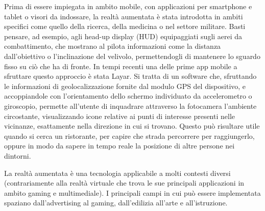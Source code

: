Prima di essere impiegata in ambito mobile, con applicazioni per smartphone e tablet o visori da indossare, la realtà aumentata è stata introdotta in ambiti specifici come quello della ricerca, della medicina o nel settore militare. Basti pensare, ad esempio, agli head-up display (HUD) equipaggiati sugli aerei da combattimento, che mostrano al pilota informazioni come la distanza dall’obiettivo o l’inclinazione del velivolo, permettendogli di mantenere lo sguardo fisso su ciò che ha di fronte.
In tempi recenti una delle prime app mobile a sfruttare questo approccio è stata Layar. Si tratta di un software che, sfruttando le informazioni di geolocalizzazione fornite dal modulo GPS del dispositivo, e accoppiandole con l’orientamento dello schermo individuato da accelerometro o giroscopio, permette all’utente di inquadrare attraverso la fotocamera l’ambiente circostante, visualizzando icone relative ai punti di interesse presenti nelle vicinanze, esattamente nella direzione in cui si trovano. Questo può risultare utile quando si cerca un ristorante, per capire che strada percorrere per raggiungerlo, oppure in modo da sapere in tempo reale la posizione di altre persone nei dintorni.

La realtà aumentata è una tecnologia applicabile a molti contesti diversi (contrariamente alla realt\`a virtuale che trova le sue principali applicazioni in ambito gaming e multimediale). I principali campi in cui pu\`o essere implementata spaziano dall'advertising al gaming, dall'edilizia all'arte e all'istruzione.